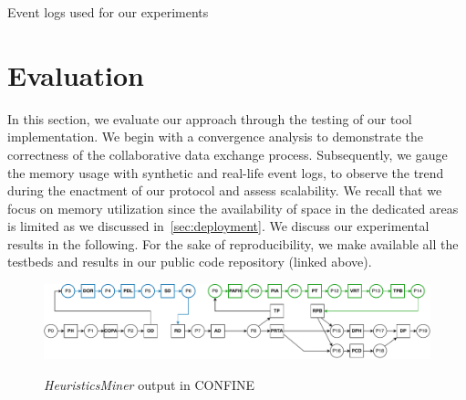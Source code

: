 \begin{table}[t]%
	\caption{Event logs used for our experiments}
	\label{tab:testedlogs}
	\centering
	
\end{table}
\label{sec:discussion:subsec:convergence}
\section{Evaluation}
\label{sec:evaluation}

In this section, we evaluate our approach through the testing of our tool implementation. %
We begin with a convergence analysis %
to demonstrate the correctness of the collaborative data exchange process. Subsequently, we %
gauge the memory usage with synthetic and real-life event logs, to observe the trend during the enactment of our protocol and assess scalability. We recall that we focus on memory utilization since the availability of space in the dedicated areas is limited as we discussed in~\cref{sec:deployment}. We discuss our experimental results in the following.
For the sake of reproducibility, we make available all the testbeds and results in our public code repository (linked above).
%
\begin{figure}[t]
	\includegraphics[width=1\linewidth]{content/figures/mergedDep1.pdf}\label{fig:wfnet:d}
	\caption[HeuristicsMiner output]{\emph{HeuristicsMiner} output in CONFINE}
	\label{fig:wfnet}
\end{figure}    


